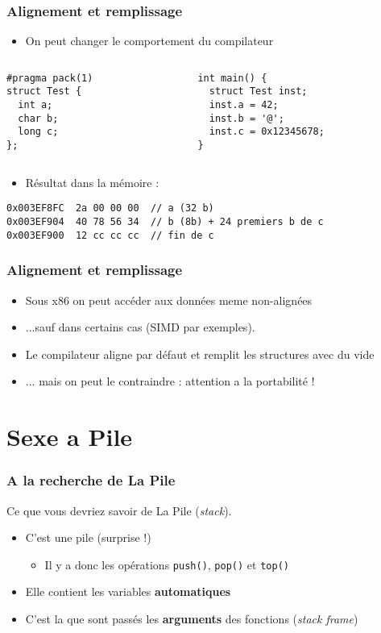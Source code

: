 \documentclass{beamer}
\begin{document}
\begin{frame}[fragile]
\frametitle{Alignement et remplissage}
\begin{itemize}
\item On peut changer le comportement du compilateur 
\end{itemize}
\begin{columns}
  \begin{column}{0.3\textwidth}
\begin{lstlisting}
#pragma pack(1)
struct Test {
  int a;
  char b;
  long c;
};
\end{lstlisting}
  \end{column}
  \begin{column}{0.5\textwidth}
\begin{lstlisting}
int main() {
  struct Test inst;
  inst.a = 42;
  inst.b = '@';
  inst.c = 0x12345678;
}
\end{lstlisting}
  \end{column}
\end{columns}
\pause
\begin{itemize}
\item Résultat dans la mémoire : 
\end{itemize}
\begin{lstlisting}
0x003EF8FC  2a 00 00 00  // a (32 b)  
0x003EF904  40 78 56 34  // b (8b) + 24 premiers b de c 
0x003EF900  12 cc cc cc  // fin de c 
\end{lstlisting}
\end{frame}
\begin{frame}
\frametitle{Alignement et remplissage}
\begin{itemize}
\item Sous x86 on peut accéder aux données meme non-alignées
\item ...sauf dans certains cas (SIMD par exemples).
\item Le compilateur aligne par défaut et remplit les structures avec du vide
\item ... mais on peut le contraindre : attention a la portabilité !
\end{itemize}
\end{frame}


\section{Sexe a Pile}

\begin{frame}
\frametitle{A la recherche de La Pile}
Ce que vous devriez savoir de La Pile (\textit{stack}).
\begin{itemize}
\item C'est une pile (surprise !)
        \begin{itemize}
        \item Il y a donc les opérations \texttt{push()}, \texttt{pop()} et  \texttt{top()}
        \end{itemize}
\item Elle contient les variables \textbf{automatiques} 
\item C'est la que sont passés les \textbf{arguments} des fonctions (\textit{stack frame})
\end{itemize}
\end{frame}
\end{document}
